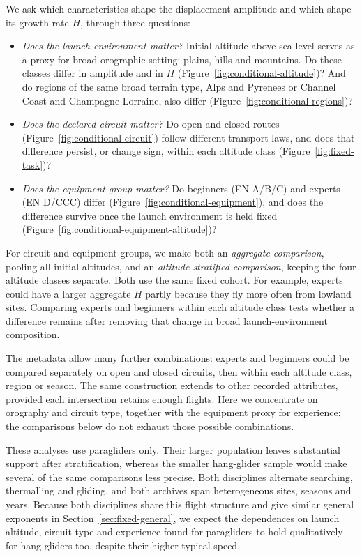 We ask which characteristics shape the displacement amplitude and which shape
its growth rate $H$, through three questions:
\begin{itemize}
 \item \emph{Does the launch environment matter?} Initial altitude above sea level
 serves as a proxy for broad orographic setting: plains, hills and mountains. Do
 these classes differ in amplitude and in $H$
 (Figure~\ref{fig:conditional-altitude})? And do regions of the same broad terrain
 type, Alps and Pyrenees or Channel Coast and Champagne-Lorraine, also differ
 (Figure~\ref{fig:conditional-regions})?
 \item \emph{Does the declared circuit matter?} Do open and closed routes
 (Figure~\ref{fig:conditional-circuit}) follow different transport laws, and does
 that difference persist, or change sign, within each altitude class
 (Figure~\ref{fig:fixed-task})?
 \item \emph{Does the equipment group matter?} Do beginners (EN A/B/C) and experts
 (EN D/CCC) differ (Figure~\ref{fig:conditional-equipment}), and does the
 difference survive once the launch environment is held fixed
 (Figure~\ref{fig:conditional-equipment-altitude})?
\end{itemize}
For circuit and equipment groups, we make both an \emph{aggregate comparison},
pooling all initial altitudes, and an \emph{altitude-stratified comparison},
keeping the four altitude classes separate. Both use the same fixed cohort.
For example, experts could have a larger aggregate $H$ partly because they fly
more often from lowland sites. Comparing experts and beginners within each
altitude class tests whether a difference remains after removing that change
in broad launch-environment composition.

The metadata allow many further combinations: experts and beginners could be
compared separately on open and closed circuits, then within each altitude class,
region or season. The same construction extends to other recorded attributes,
provided each intersection retains enough flights. Here we concentrate on
orography and circuit type, together with the equipment proxy for experience;
the comparisons below do not exhaust those possible combinations.

These analyses use paragliders only. Their larger population leaves substantial
support after stratification, whereas the smaller hang-glider sample would make
several of the same comparisons less precise. Both disciplines alternate searching,
thermalling and gliding, and both archives span heterogeneous sites, seasons and
years. Because both disciplines share this flight structure and give similar general
exponents in Section~\ref{sec:fixed-general}, we expect the dependences on
launch altitude, circuit type and experience found for paragliders to hold
qualitatively for hang gliders too, despite their higher typical speed. 


